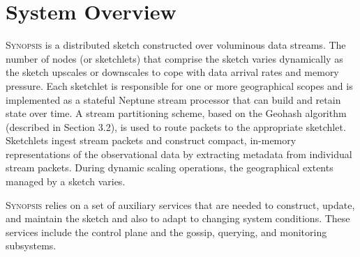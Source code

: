 \section{System Overview}
\textsc{Synopsis} is a distributed sketch constructed over voluminous data streams.
The number of nodes (or sketchlets) that comprise the sketch varies dynamically as the sketch upscales or downscales to cope with data arrival rates and memory pressure.
Each sketchlet is responsible for one or more geographical scopes and is implemented as a stateful Neptune stream processor that can build and retain state over time.
A stream partitioning scheme, based on the Geohash algorithm (described in Section 3.2), is used to route packets to the appropriate sketchlet.
Sketchlets ingest stream packets and construct compact, in-memory representations of the observational data by extracting metadata from individual stream packets.
During dynamic scaling operations, the geographical extents managed by a sketch varies.

\textsc{Synopsis} relies on a set of auxiliary services that are needed to construct, update, and maintain the sketch and also to adapt to changing system conditions.
These services include the control plane and the gossip, querying, and monitoring subsystems.

